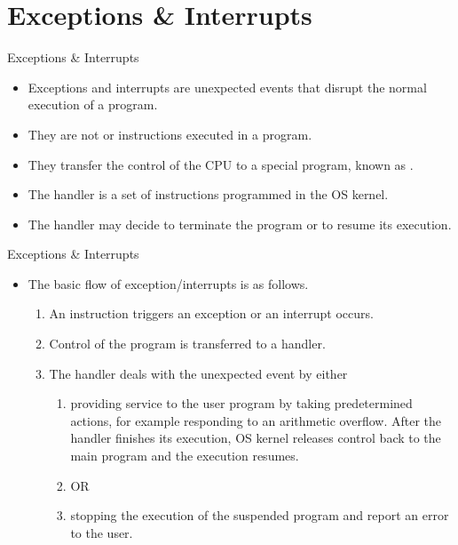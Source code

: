 \section{Exceptions \& Interrupts}
% 
\begin{frame}{Exceptions \& Interrupts}{}
\begin{itemize}
\item Exceptions and interrupts are unexpected events that disrupt the normal execution of a program. 
\item They are not  or  instructions executed in a program. 
\item They transfer the control of the \ac{CPU} to a special program, known as .
\item The handler is a set of instructions programmed in the \ac{OS} kernel.
\item The handler may decide to terminate the program or to resume its execution.

\end{itemize}
\end{frame} 

% 
\begin{frame}{Exceptions \& Interrupts}{}
\begin{itemize}
\item The basic flow of exception/interrupts is as follows.
\begin{enumerate}
\item An instruction triggers an exception or an interrupt occurs.
\item Control of the program is transferred to a handler.
\item The handler deals with the unexpected event by either
\begin{enumerate}
\item providing service to the user program by taking predetermined actions, for example responding to an arithmetic overflow. 
After the handler finishes its execution, \ac{OS} kernel releases control back to the main program and the execution resumes.
\item[] OR
\item stopping the execution of the suspended program and report an error to the user.
\end{enumerate}
\end{enumerate}
\end{itemize}
\end{frame}

